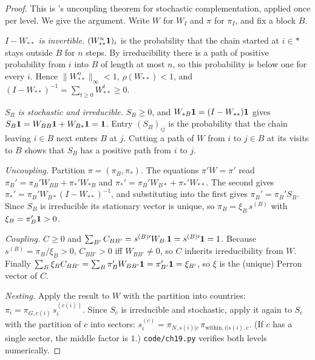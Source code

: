 \documentclass[../structural_economics_book.tex]{subfiles}
\begin{document}
\begin{proof}
This is \citeauthor{meyer1989stochastic}'s \citeyearpar{meyer1989stochastic} uncoupling theorem for stochastic complementation, applied once per level. We give the argument. Write $W$ for $W_I$ and $\pi$ for $\pi_I$, and fix a block $B$.

\emph{$I - W_{\ast\ast}$ is invertible.} $(W_{\ast\ast}^n\mathbf{1})_i$ is the probability that the chain started at $i \in \ast$ stays outside $B$ for $n$ steps. By irreducibility there is a path of positive probability from $i$ into $B$ of length at most $n$, so this probability is below one for every $i$. Hence $\|W_{\ast\ast}^n\|_\infty < 1$, $\rho(W_{\ast\ast}) < 1$, and $(I - W_{\ast\ast})^{-1} = \sum_{t\ge0}W_{\ast\ast}^t \ge 0$.

\emph{$S_B$ is stochastic and irreducible.} $S_B \ge 0$, and $W_{\ast B}\mathbf{1} = (I - W_{\ast\ast})\mathbf{1}$ gives $S_B\mathbf{1} = W_{BB}\mathbf{1} + W_{B\ast}\mathbf{1} = \mathbf{1}$. Entry $(S_B)_{ij}$ is the probability that the chain leaving $i \in B$ next enters $B$ at $j$. Cutting a path of $W$ from $i$ to $j \in B$ at its visits to $B$ shows that $S_B$ has a positive path from $i$ to $j$.

\emph{Uncoupling.} Partition $\pi = (\pi_B, \pi_\ast)$. The equations $\pi'W = \pi'$ read $\pi_B' = \pi_B'W_{BB} + \pi_\ast'W_{\ast B}$ and $\pi_\ast' = \pi_B'W_{B\ast} + \pi_\ast'W_{\ast\ast}$. The second gives $\pi_\ast' = \pi_B'W_{B\ast}(I - W_{\ast\ast})^{-1}$, and substituting into the first gives $\pi_B' = \pi_B'S_B$. Since $S_B$ is irreducible its stationary vector is unique, so $\pi_B = \xi_B\, s^{(B)}$ with $\xi_B = \pi_B'\mathbf{1} > 0$.

\emph{Coupling.} $C \ge 0$ and $\sum_{B'}C_{BB'} = s^{(B)\prime}W_{B\cdot}\mathbf{1} = s^{(B)\prime}\mathbf{1} = 1$. Because $s^{(B)} = \pi_B/\xi_B > 0$, $C_{BB'} > 0$ iff $W_{BB'} \ne 0$, so $C$ inherits irreducibility from $W$. Finally $\sum_B \xi_B C_{BB'} = \sum_B \pi_B'W_{BB'}\mathbf{1} = \pi_{B'}'\mathbf{1} = \xi_{B'}$, so $\xi$ is the (unique) Perron vector of $C$.

\emph{Nesting.} Apply the result to $W$ with the partition into countries: $\pi_i = \pi_{G,c(i)}\, s^{(c(i))}_i$. Since $S_c$ is irreducible and stochastic, apply it again to $S_c$ with the partition of $c$ into sectors: $s^{(c)}_i = \pi_{N,s(i)|c}\,\pi_{\text{within},i|s(i),c}$. (If $c$ has a single sector, the middle factor is $1$.) \texttt{code/ch19.py} verifies both levels numerically.
\end{proof}
\end{document}
